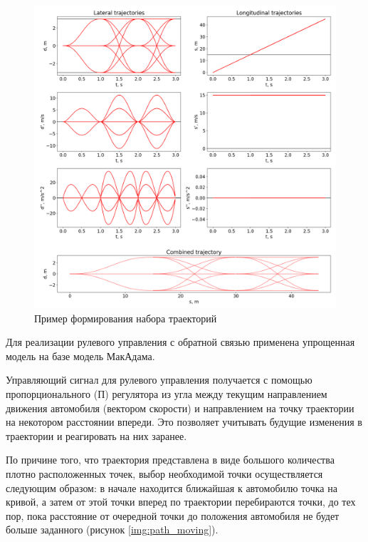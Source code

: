 \begin{figure}[h]
    \centering
    \includegraphics[width=\linewidth]{images/2_project/quintic_2/multistep_trajectories}
          \caption{Пример формирования набора траекторий}
    \label{img:multistep_trajectories}
\end{figure}

Для реализации рулевого управления с обратной связью применена упрощенная модель на базе
модель МакАдама.

Управляющий сигнал для рулевого управления получается с помощью пропорционального (П) регулятора
из угла между текущим направлением движения автомобиля (вектором скорости) и направлением на
точку траектории на некотором расстоянии впереди. Это позволяет учитывать будущие изменения
в траектории и реагировать на них заранее.

По причине того, что траектория представлена в виде большого количества плотно расположенных
точек, выбор необходимой точки осуществляется следующим образом: в начале находится ближайшая к автомобилю
точка на кривой, а затем от этой точки вперед по траектории перебираются точки, до тех пор, пока
расстояние от очередной точки до положения автомобиля не будет больше заданного (рисунок \ref{img:path_moving}).


